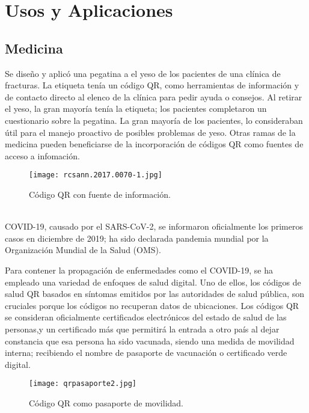 
\section{Usos y Aplicaciones}

\subsection{Medicina}
Se diseño y aplicó una pegatina a el yeso de los pacientes de una clínica de fracturas. La etiqueta tenía un código QR, como herramientas de información y de contacto directo al elenco de la clínica para pedir ayuda o consejos. Al retirar el yeso, la gran mayoría tenía la etiqueta; los pacientes completaron un cuestionario sobre la pegatina. La gran mayoría de los pacientes, lo consideraban útil para el manejo proactivo de posibles problemas de yeso.  Otras ramas de la medicina pueden beneficiarse de la incorporación de códigos QR como fuentes de acceso a infomación.\cite{2017_Gough}
\begin{figure} 
	\centering
	\texttt{[image: rcsann.2017.0070-1.jpg]}
	\caption{Código QR con fuente de información.}
	\label{fig:qryeso}
\end{figure} 
\\
COVID-19, causado por el SARS-CoV-2, se informaron oficialmente los primeros casos en diciembre de 2019; ha sido declarada pandemia mundial por la Organización Mundial de la Salud (OMS). \cite{2020_Organization} 

Para contener la propagación de enfermedades como el COVID-19, se ha empleado una variedad de enfoques de salud digital.\cite{2020_Breeher}
Uno de ellos, los códigos de salud QR basados en síntomas emitidos por las autoridades de salud pública, son cruciales porque los códigos no recuperan datos de ubicaciones. Los códigos QR se consideran oficialmente certificados electrónicos del estado de salud de las personas,y un certificado más que permitirá la entrada a otro país al dejar constancia que esa persona ha sido vacunada, siendo una medida de movilidad interna; recibiendo el nombre de pasaporte de vacunación o certificado verde digital.\cite{2020_Nakamoto,Commission2021}
\begin{figure} 
	\centering
	\texttt{[image: qrpasaporte2.jpg]}
	\caption{Código QR como pasaporte de movilidad.}
	\label{fig:qrpasaporte}
\end{figure} 


